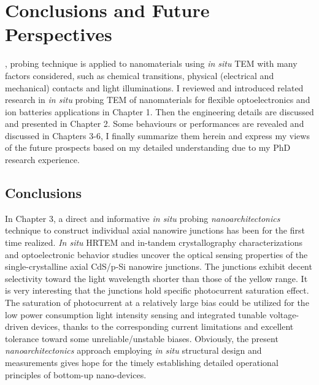 

\chapter{Conclusions and Future Perspectives}

, probing technique is applied to nanomaterials using \emph{in situ} TEM with many factors considered, such as chemical transitions, physical (electrical and mechanical) contacts and light illuminations. 
I reviewed and introduced related research in {\it in situ} probing TEM of nanomaterials for flexible optoelectronics and ion batteries applications in Chapter 1. 
Then the engineering details are discussed and presented in Chapter 2. 
Some behaviours or performances are revealed and discussed in Chapters 3-6, I finally summarize them herein and express my views of the future prospects based on my detailed understanding due to my PhD research experience. 

\section{Conclusions}
In Chapter 3, a direct and informative {\it in situ} probing \textit{nanoarchitectonics} technique to construct individual axial nanowire junctions has been for the first time realized. 
{\it In situ} HRTEM and in-tandem crystallography characterizations and optoelectronic behavior studies uncover the optical sensing properties of the single-crystalline axial CdS/p-Si nanowire junctions. 
The junctions exhibit decent selectivity toward the light wavelength shorter than those of the yellow range. 
It is very interesting that the junctions hold specific photocurrent saturation effect. 
The saturation of photocurrent at a relatively large bias could be utilized for the low power consumption light intensity sensing and integrated tunable voltage-driven devices, thanks to the corresponding current limitations and excellent tolerance toward some unreliable/unstable biases. 
Obviously, the present {\it nanoarchitectonics} approach employing {\it in situ} structural design and measurements gives hope for the timely establishing detailed operational principles of bottom-up nano-devices. \\

